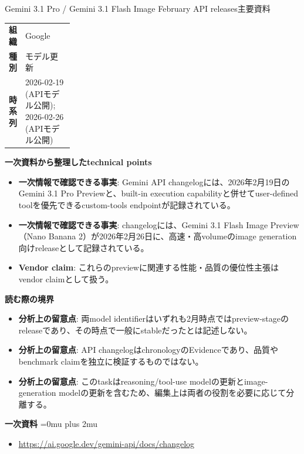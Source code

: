 \begin{technicalnote}{Gemini 3.1 Pro / Gemini 3.1 Flash Image February API releases}{主要資料}
\begingroup
\begin{tabularx}{\linewidth}{@{}>{\bfseries}p{0.22\linewidth}X@{}}
組織 & Google \\
種別 & モデル更新 \\
時系列 & 2026-02-19 (APIモデル公開); 2026-02-26 (APIモデル公開) \\
\end{tabularx}
\smallskip
{\bfseries 一次資料から整理したtechnical points}
\begin{itemize}[leftmargin=1.5em,itemsep=0.35em]
\item \textbf{一次情報で確認できる事実}: Gemini API changelogには、2026年2月19日のGemini 3.1 Pro Previewと、built-in execution capabilityと併せてuser-defined toolを優先できるcustom-tools endpointが記録されている。
\item \textbf{一次情報で確認できる事実}: changelogには、Gemini 3.1 Flash Image Preview（Nano Banana 2）が2026年2月26日に、高速・高volumeのimage generation向けreleaseとして記録されている。
\item \textbf{Vendor claim}: これらのpreviewに関連する性能・品質の優位性主張はvendor claimとして扱う。
\end{itemize}
\begin{minipage}{\linewidth}
{\bfseries 読む際の境界}
\begin{itemize}[leftmargin=1.5em,itemsep=0.35em]
\item \textbf{分析上の留意点}: 両model identifierはいずれも2月時点ではpreview-stageのreleaseであり、その時点で一般にstableだったとは記述しない。
\item \textbf{分析上の留意点}: API changelogはchronologyのEvidenceであり、品質やbenchmark claimを独立に検証するものではない。
\item \textbf{分析上の留意点}: このtaskはreasoning/tool-use modelの更新とimage-generation modelの更新を含むため、編集上は両者の役割を必要に応じて分離する。
\end{itemize}
\begin{samepage}
{\bfseries 一次資料}
\begingroup\sloppy
\Urlmuskip=0mu plus 2mu\relax
\begin{itemize}[leftmargin=1.5em,itemsep=0.25em]
\item {\scriptsize\url{https://ai.google.dev/gemini-api/docs/changelog}}
\end{itemize}
\endgroup
\end{samepage}
\end{minipage}
\endgroup
\end{technicalnote}
\medskip

